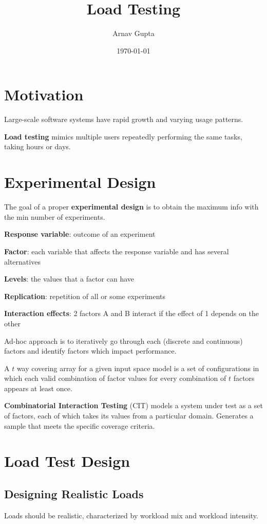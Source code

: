 \documentclass[11pt]{article}
\author{Arnav Gupta}
\date{\today}
\title{Load Testing}
\begin{document}
\maketitle
\tableofcontents

\section{Motivation}
\label{sec:org50b2f35}
Large-scale software systems have rapid growth and varying usage patterns.

\textbf{Load testing} mimics multiple users repeatedly performing the same tasks, taking hours or days.
\section{Experimental Design}
\label{sec:org5b32ca6}
The goal of a proper \textbf{experimental design} is to obtain the maximum info with the min number of
experiments.

\textbf{Response variable}: outcome of an experiment

\textbf{Factor}: each variable that affects the response variable and has several alternatives

\textbf{Levels}: the values that a factor can have

\textbf{Replication}: repetition of all or some experiments

\textbf{Interaction effects}: 2 factors A and B interact if the effect of 1 depends on the other

Ad-hoc approach is to iteratively go through each (discrete and continuous) factors and identify
factors which impact performance.

A \(t\) way covering array for a given input space model is a set of configurations in which each
valid combination of factor values for every combination of \(t\) factors appears at least once.

\textbf{Combinatorial Interaction Testing} (CIT) models a system under test as a set of factors, each of
which takes its values from a particular domain. Generates a sample that meets the specific coverage
criteria.
\section{Load Test Design}
\label{sec:orgb91b061}
\subsection{Designing Realistic Loads}
\label{sec:org766900e}
Loads should be realistic, characterized by workload mix and workload intensity.
\end{document}
